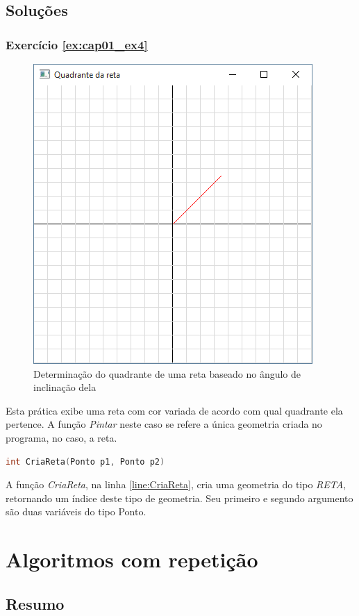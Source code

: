 \section*{Soluções}

\subsection*{Exercício \ref{ex:cap01_ex4}}
\begin{figure}[ht]
  \centerline{\includegraphics[width=.5\textwidth]{img/cap1_ex4.png}}
  \caption{Determinação do quadrante de uma reta baseado no ângulo de inclinação dela}
  \label{fig:cap01_ex4}
\end{figure}
Esta prática exibe uma reta com cor variada de acordo com qual quadrante ela pertence. A função \emph{Pintar} neste caso se refere a única geometria criada no programa, no caso, a reta.


\begin{lstlisting}[label={func:CriaReta},language=C++]
int CriaReta(Ponto p1, Ponto p2)
\end{lstlisting}
A função \emph{CriaReta}, na linha \ref{line:CriaReta}, cria uma geometria do tipo \emph{RETA}, retornando um índice deste tipo de geometria. Seu primeiro e segundo argumento são duas variáveis do tipo Ponto.

\chapter[Algoritmos com repetição]
{Algoritmos com repetição}



\section*{Resumo}

